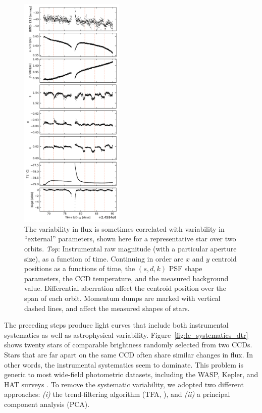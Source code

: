 \documentclass[12pt,twocolumn,tighten]{aastex62}
\begin{document}
\begin{figure}[!t]
	\begin{center}
		\leavevmode
		\includegraphics[width=0.44\textwidth]{external_parameters_vs_time_sec6cam1ccd1.pdf}
	\end{center}
	\vspace{-0.5cm}
	\caption{
    The variability in flux is sometimes correlated with variability
    in ``external'' parameters, shown here for a representative star
    over two orbits.  {\it Top}: Instrumental raw magnitude (with a
    particular aperture size), as a function of time.  Continuing in
    order are $x$ and $y$ centroid positions as a functions of time,
    the $(s,d,k)$ PSF shape parameters, the CCD temperature,  and the
    measured background value.  Differential aberration affect the
    centroid position over the span of each orbit.  Momentum dumps are
    marked with vertical dashed lines, and affect the measured shapes
    of stars.
		\label{fig:external_parameter_timeseries}
	}
\end{figure}

The preceding steps produce light curves that include both
instrumental systematics as well as astrophysical variability.
Figure~\ref{fig:lc_systematics_dtr} shows twenty stars of comparable
brightness randomly selected from two CCDs.  Stars that are far apart
on the same CCD often share similar changes in flux.  In other words,
the instrumental systematics seem to dominate.  This problem is
generic to most wide-field photometric datasets, including the WASP,
Kepler, and HAT surveys
\cite{Pollacco_2006,borucki_kepler_2010,bakos_hat_review_2018}.  To
remove the systematic variability, we adopted two different
approaches: {\it (i)} the trend-filtering algorithm (TFA,
\citealt{kovacs_trend_2005}), and {\it (ii)} a principal component
analysis (PCA).
\end{document}
